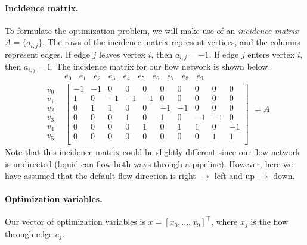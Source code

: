 \paragraph{Incidence matrix.} To formulate the optimization problem, we will make use of an \emph{incidence matrix} $A = \lbrace a_{i,j} \rbrace$. The rows of the incidence matrix represent vertices, and the columns represent edges. If edge $j$ leaves vertex $i$, then $a_{i,j} = -1$. If edge $j$ enters vertex $i$, then $a_{i,j} = 1$. The incidence matrix for our flow network is shown below.
\[
\begin{array}{cc}
& 
e_0\ \ \ \ e_1\ \ \ \ e_2\ \ \ \ e_3\ \ \ \ e_4\ \ \ \ e_5\ \ \ \ e_6\ \ \ \ e_7\ \ \ \ e_8\ \ \ \ e_9
\\
\begin{array}{r}
v_0 \\ v_1 \\ v_2 \\ v_3 \\ v_4 \\ v_5
\end{array}
&
\left[
\begin{array}{cccccccccc}
-1 & -1 &  0 &  0 &  0 &  0 &  0 &  0 &  0 &  0 \\
 1 &  0 & -1 & -1 & -1 &  0 &  0 &  0 &  0 &  0 \\
 0 &  1 &  1 &  0 &  0 & -1 & -1 &  0 &  0 &  0 \\
 0 &  0 &  0 &  1 &  0 &  1 &  0 & -1 & -1 &  0 \\
 0 &  0 &  0 &  0 &  1 &  0 &  1 &  1 &  0 & -1 \\
 0 &  0 &  0 &  0 &  0 &  0 &  0 &  0 &  1 &  1 \\
\end{array}
\right]
\end{array}
= A
\]
Note that this incidence matrix could be slightly different since our flow network is undirected (liquid can flow both ways through a pipeline). However, here we have assumed that the default flow direction is right $\rightarrow$ left and up $\rightarrow$ down.

\paragraph{Optimization variables.} Our vector of optimization variables is $x = [x_0,\dots,x_9]^\top$, where $x_j$ is the flow through edge $e_j$.

